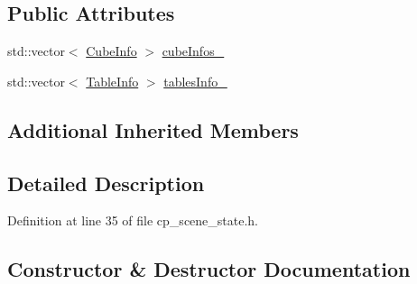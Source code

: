 \subsection*{Public Attributes}
\begin{DoxyCompactItemize}
\item 
std\+::vector$<$ \hyperlink{structsm__fetch__six__table__pick__n__sort__1_1_1cl__perception__system_1_1CubeInfo}{Cube\+Info} $>$ \hyperlink{classsm__fetch__six__table__pick__n__sort__1_1_1cl__perception__system_1_1CpSceneState_a9e412e0e18779e1fe371b0160919bd9b}{cube\+Infos\+\_\+}
\item 
std\+::vector$<$ \hyperlink{structsm__fetch__six__table__pick__n__sort__1_1_1cl__perception__system_1_1TableInfo}{Table\+Info} $>$ \hyperlink{classsm__fetch__six__table__pick__n__sort__1_1_1cl__perception__system_1_1CpSceneState_a2de6a25cdfe869099984fbf8225874cd}{tables\+Info\+\_\+}
\end{DoxyCompactItemize}
\subsection*{Additional Inherited Members}


\subsection{Detailed Description}


Definition at line 35 of file cp\+\_\+scene\+\_\+state.\+h.



\subsection{Constructor \& Destructor Documentation}
\mbox{\label{classsm__fetch__six__table__pick__n__sort__1_1_1cl__perception__system_1_1CpSceneState_a5564b8dae914a5567b6ccb671fd878ce}} 
